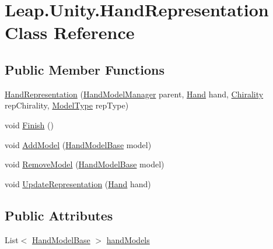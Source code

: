 \hypertarget{class_leap_1_1_unity_1_1_hand_representation}{}\section{Leap.\+Unity.\+Hand\+Representation Class Reference}
\label{class_leap_1_1_unity_1_1_hand_representation}
\subsection*{Public Member Functions}
\begin{DoxyCompactItemize}
\item 
\mbox{\hyperlink{class_leap_1_1_unity_1_1_hand_representation_a822064352dc70ceac75f76f454f633ea}{Hand\+Representation}} (\mbox{\hyperlink{class_leap_1_1_unity_1_1_hand_model_manager}{Hand\+Model\+Manager}} parent, \mbox{\hyperlink{class_leap_1_1_hand}{Hand}} hand, \mbox{\hyperlink{namespace_leap_1_1_unity_a4d15adcf20ba121b2cd9c07f503b606f}{Chirality}} rep\+Chirality, \mbox{\hyperlink{namespace_leap_1_1_unity_a186e5eb0a2b743f1f6b79346f0ab8ad0}{Model\+Type}} rep\+Type)
\item 
void \mbox{\hyperlink{class_leap_1_1_unity_1_1_hand_representation_a0f6b705675cb8f356b48330637483e78}{Finish}} ()
\item 
void \mbox{\hyperlink{class_leap_1_1_unity_1_1_hand_representation_ac21a6875139515363a4cd1ef206568b8}{Add\+Model}} (\mbox{\hyperlink{class_leap_1_1_unity_1_1_hand_model_base}{Hand\+Model\+Base}} model)
\item 
void \mbox{\hyperlink{class_leap_1_1_unity_1_1_hand_representation_a6fa7f5ae7b4027c0d9b4a3c6b1b0d44f}{Remove\+Model}} (\mbox{\hyperlink{class_leap_1_1_unity_1_1_hand_model_base}{Hand\+Model\+Base}} model)
\item 
void \mbox{\hyperlink{class_leap_1_1_unity_1_1_hand_representation_ae15ad136584177f5394e1a157089ef3d}{Update\+Representation}} (\mbox{\hyperlink{class_leap_1_1_hand}{Hand}} hand)
\end{DoxyCompactItemize}
\subsection*{Public Attributes}
\begin{DoxyCompactItemize}
\item 
List$<$ \mbox{\hyperlink{class_leap_1_1_unity_1_1_hand_model_base}{Hand\+Model\+Base}} $>$ \mbox{\hyperlink{class_leap_1_1_unity_1_1_hand_representation_ab74a6ece88663f24aac02b88a750b1e3}{hand\+Models}}
\end{DoxyCompactItemize}
